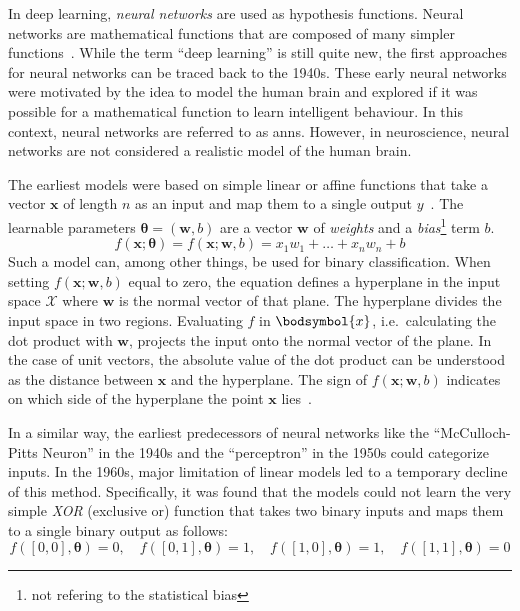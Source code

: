 In deep learning, \textit{neural networks} are used as hypothesis functions.
Neural networks are mathematical functions that are composed of many simpler functions~\autocite{Goodfellow-et-al-2016}.
While the term \enquote{deep learning} is still quite new, the first approaches for neural networks can be traced back to the 1940s.
These early neural networks were motivated by the idea to model the human brain and explored if it was possible for a mathematical function to learn intelligent behaviour.
In this context, neural networks are referred to as \glspl{ann}.
However, in neuroscience, neural networks are not considered a realistic model of the human brain.

The earliest models were based on simple linear or affine functions that take a vector $\boldsymbol{x}$ of length $n$ as an input and map them to a single output $y$~\autocite{Goodfellow-et-al-2016}.
The learnable parameters $\boldsymbol{\theta} = (\boldsymbol{w}, b)$ are a vector $\boldsymbol{w}$ of \textit{weights} and a \textit{bias}\footnote{not refering to the statistical bias} term $b$.
\[
    f(\boldsymbol{x}; \boldsymbol{\theta}) = f(\boldsymbol{x}; \boldsymbol{w}, b) = x_1 w_1 + \dots + x_n w_n + b
\]
Such a model can, among other things, be used for binary classification.
When setting $f(\boldsymbol{x}; \boldsymbol{w}, b)$ equal to zero, the equation defines a hyperplane in the input space $\mathcal{X}$ where $\boldsymbol{w}$ is the normal vector of that plane.
The hyperplane divides the input space in two regions.
Evaluating $f$ in $\bodsymbol{x}$, i.e.\ calculating the dot product with $\boldsymbol{w}$, projects the input onto the normal vector of the plane.
In the case of unit vectors, the absolute value of the dot product can be understood as the distance between $\boldsymbol{x}$ and the hyperplane.
The sign of $f(\boldsymbol{x}; \boldsymbol{w}, b)$ indicates on which side of the hyperplane the point $\boldsymbol{x}$ lies~\autocite{bishop2006}.

In a similar way, the earliest predecessors of neural networks like the \enquote{McCulloch-Pitts Neuron} in the 1940s and the \enquote{perceptron} in the 1950s could categorize inputs.
In the 1960s, major limitation of linear models led to a temporary decline of this method.
Specifically, it was found that the models could not learn the very simple \textit{XOR} (exclusive or) function that takes two binary inputs and maps them to a single binary output as follows:
\[
    f([0,0], \boldsymbol{\theta}) = 0, \quad
    f([0,1], \boldsymbol{\theta}) = 1, \quad
    f([1,0], \boldsymbol{\theta}) = 1, \quad
    f([1,1], \boldsymbol{\theta}) = 0
\]

